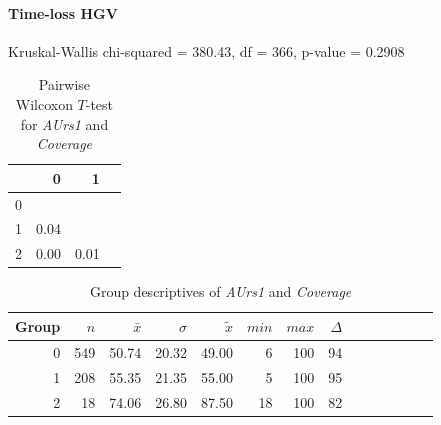 \paragraph{Time-loss HGV}
Kruskal-Wallis chi-squared = 380.43, df = 366, p-value = 0.2908

\begin{table}[ht]
	\small
	\centering
    \begin{tabular}{rrrr}
        \toprule
        & 0 & 1 \\ 
        \midrule
        0 &  &  \\ 
        1 & 0.04 &  \\ 
        2 & 0.00 & 0.01 \\ 
        \bottomrule
      \end{tabular}
    \caption{Pairwise Wilcoxon $T$-test for \textit{AUrs1} and \textit{Coverage}}
    \label{tbl:wilcoxon_baysis_initiator_AUrs1_Cov}
\end{table}
\begin{table}[ht]
	\small
	\centering
    \begin{tabular}{rrrrrrrrrrrrrr}
        \toprule
        Group & $n$ & $\bar{x}$ & $\sigma$ & $\tilde{x}$ & $min$ & $max$ & $\Delta$ \\
        \midrule
        0 & 549 & 50.74 & 20.32 & 49.00 & 6  & 100 & 94 \\ 
        1 & 208 & 55.35 & 21.35 & 55.00 & 5  & 100 & 95 \\ 
        2 & 18  & 74.06 & 26.80 & 87.50 & 18 & 100 & 82 \\ 
        \bottomrule
      \end{tabular}
    \caption{Group descriptives of \textit{AUrs1} and \textit{Coverage}}
    \label{tbl:descriptives_baysis_initiator_AUrs1_Cov}
\end{table}